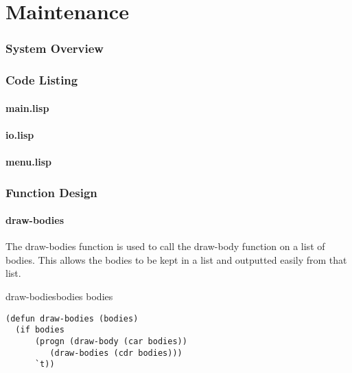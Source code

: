 \part{Maintenance}

\section{System Overview}


\section{Code Listing}
\subsection{main.lisp}

\subsection{io.lisp}

\subsection{menu.lisp}



\section{Function Design}

\subsection{draw-bodies}
The draw-bodies function is used to call the draw-body function on a list of
bodies. This allows the bodies to be kept in a list and outputted easily from
that list.

\begin{pseudocode}{draw-bodies}{bodies}
	\IF bodies
	  \THEN 
	    \BEGIN
	    	 \\
	    \END
	  \ELSE
      	    \RETURN{\TRUE}	
\end{pseudocode}

\begin{lstlisting}
(defun draw-bodies (bodies)
  (if bodies
      (progn (draw-body (car bodies))
	     (draw-bodies (cdr bodies)))
      `t)) 
\end{lstlisting}

